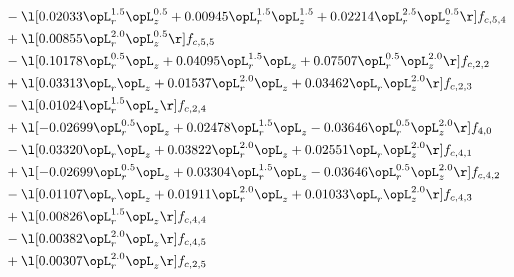 \begin{alignat}{2}
& - \l[  0.02033 \opL_r^{1.5} \opL_z^{0.5} +  0.00945 \opL_r^{1.5} \opL_z^{1.5} +  0.02214 \opL_r^{2.5} \opL_z^{0.5}  \r] f_{c,5,4} \nonumber \\ 
& + \l[  0.00855 \opL_r^{2.0} \opL_z^{0.5}  \r] f_{c,5,5} \nonumber \\ 
& - \l[  0.10178 \opL_r^{0.5} \opL_z +  0.04095 \opL_r^{1.5} \opL_z +  0.07507 \opL_r^{0.5} \opL_z^{2.0}  \r] f_{c,2,2} \nonumber \\ 
& + \l[  0.03313 \opL_r \opL_z +  0.01537 \opL_r^{2.0} \opL_z +  0.03462 \opL_r \opL_z^{2.0}  \r] f_{c,2,3} \nonumber \\ 
& - \l[  0.01024 \opL_r^{1.5} \opL_z  \r] f_{c,2,4} \nonumber \\ 
& + \l[  -0.02699 \opL_r^{0.5} \opL_z +  0.02478 \opL_r^{1.5} \opL_z   -0.03646 \opL_r^{0.5} \opL_z^{2.0}  \r] f_{4,0} \nonumber \\ 
& - \l[  0.03320 \opL_r \opL_z +  0.03822 \opL_r^{2.0} \opL_z +  0.02551 \opL_r \opL_z^{2.0}  \r] f_{c,4,1} \nonumber \\ 
& + \l[  -0.02699 \opL_r^{0.5} \opL_z +  0.03304 \opL_r^{1.5} \opL_z   -0.03646 \opL_r^{0.5} \opL_z^{2.0}  \r] f_{c,4,2} \nonumber \\ 
& - \l[  0.01107 \opL_r \opL_z +  0.01911 \opL_r^{2.0} \opL_z +  0.01033 \opL_r \opL_z^{2.0}  \r] f_{c,4,3} \nonumber \\ 
& + \l[  0.00826 \opL_r^{1.5} \opL_z  \r] f_{c,4,4} \nonumber \\ 
& - \l[  0.00382 \opL_r^{2.0} \opL_z  \r] f_{c,4,5} \nonumber \\ 
& + \l[  0.00307 \opL_r^{2.0} \opL_z  \r] f_{c,2,5} \nonumber \\ 
\end{alignat} 



